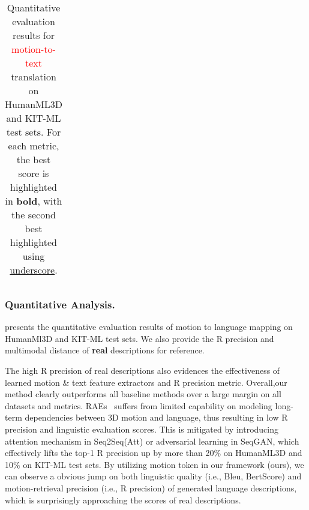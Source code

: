 \documentclass[runningheads]{llncs}
\newcommand{\aftertab}{\vspace{-9mm}}
\newcommand{\beforesubsubsection}{\vspace{-5mm}}
\begin{document}
\begin{table*}[t]
{\begin{tabular}{l l c c c c c c c c c}
    
    \bottomrule
    \end{tabular}
    }
    \caption{\footnotesize{Quantitative evaluation results for \textcolor{red}{motion-to-text} translation on HumanML3D and KIT-ML test sets. For each metric, the best score is highlighted in \textbf{bold}, with the second best highlighted using \underline{underscore}.}}
    \label{tab:quant_motion_to_text}
        \aftertab

\end{table*}

\beforesubsubsection
\subsubsection{Quantitative Analysis.}
 presents the quantitative evaluation results of motion to language mapping on HumanMl3D and KIT-ML test sets. We also provide the R precision and multimodal distance of \textbf{real} descriptions for reference.

The high R precision of real descriptions also evidences the effectiveness of learned motion \& text feature extractors and R precision metric. Overall,our method clearly outperforms all baseline methods over a large margin on all datasets and metrics. RAEs~\cite{wang2020learning} suffers from limited capability on modeling long-term dependencies between 3D motion and language, thus resulting in low R precision and linguistic evaluation scores. This is mitigated by introducing attention mechanism in Seq2Seq(Att) or adversarial learning in SeqGAN, which effectively lifts the top-1 R precision up by more than 20\% on HumanML3D and 10\% on KIT-ML test sets. By utilizing motion token in our framework (ours), we can observe a obvious jump on both linguistic quality (i.e., Bleu, BertScore) and motion-retrieval precision (i.e., R precision) of generated language descriptions, which is surprisingly approaching the scores of real descriptions. 



\beforesubsubsection
\end{document}
